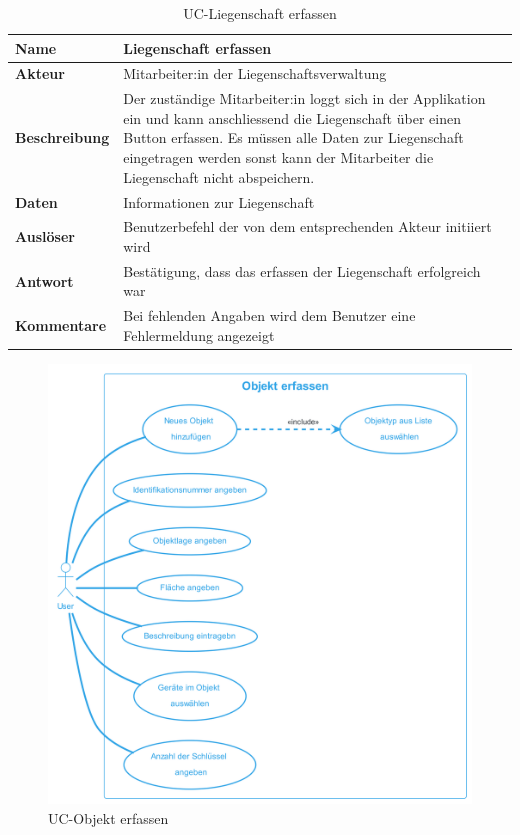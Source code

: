 \vspace*{-1cm}

\begin{table}[H]
  \centering
  \settowidth{}
  \setlength\extrarowheight{2pt}
  \begin{tabulary}{1.0\textwidth}{|a|m{14cm}|}
    \hline
    \textbf{Name}& Liegenschaft erfassen\\
    \hline
    \textbf{Akteur}& Mitarbeiter:in der Liegenschaftsverwaltung\\
    \hline 
    \textbf{Beschreibung} & Der zuständige Mitarbeiter:in loggt sich in der Applikation ein und kann anschliessend die Liegenschaft über einen Button erfassen. Es müssen alle Daten zur Liegenschaft eingetragen werden sonst kann der Mitarbeiter die Liegenschaft nicht abspeichern.\\
    \hline
    \textbf{Daten} & Informationen zur Liegenschaft\\
    \hline
    \textbf{Auslöser} & Benutzerbefehl der von dem entsprechenden Akteur initiiert wird\\
    \hline
    \textbf{Antwort} & Bestätigung, dass das erfassen der Liegenschaft erfolgreich war\\
    \hline
    \textbf{Kommentare} & Bei fehlenden Angaben wird dem Benutzer eine Fehlermeldung angezeigt\\
    \hline
  \end{tabulary}
  \caption{UC-Liegenschaft erfassen}
\end{table}

\begin{figure}[H]
  \begin{center}
    \includegraphics[width=0.8\linewidth]{content/diagrams/out/usecase/objektErfassen/ObjektErfassen.png}
    \caption{UC-Objekt erfassen}
    \label{objekt}
  \end{center}
\end{figure}

